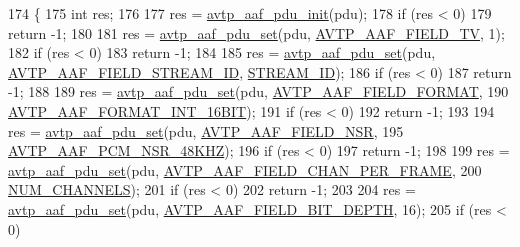 \begin{DoxyCode}
174 \{
175     \textcolor{keywordtype}{int} res;
176 
177     res = \hyperlink{avtp__aaf_8h_abbf7b8f31bede05bb514b548a0f9708f}{avtp\_aaf\_pdu\_init}(pdu);
178     \textcolor{keywordflow}{if} (res < 0)
179         \textcolor{keywordflow}{return} -1;
180 
181     res = \hyperlink{avtp__aaf_8h_af242dc7ed6c5ca5ea8e9d5071c13e19d}{avtp\_aaf\_pdu\_set}(pdu, \hyperlink{avtp__aaf_8h_a7eaee6c1ebc806c0401dbe7b14cd22dba490dfd07398cccbefac45e6a58692eab}{AVTP\_AAF\_FIELD\_TV}, 1);
182     \textcolor{keywordflow}{if} (res < 0)
183         \textcolor{keywordflow}{return} -1;
184 
185     res = \hyperlink{avtp__aaf_8h_af242dc7ed6c5ca5ea8e9d5071c13e19d}{avtp\_aaf\_pdu\_set}(pdu, \hyperlink{avtp__aaf_8h_a7eaee6c1ebc806c0401dbe7b14cd22dba4760c4bfc01d5a5200aa35cc1cdc0c13}{AVTP\_AAF\_FIELD\_STREAM\_ID}, 
      \hyperlink{aaf-talker_8c_ade86a80a3d067dece1f7e7cf957e3e92}{STREAM\_ID});
186     \textcolor{keywordflow}{if} (res < 0)
187         \textcolor{keywordflow}{return} -1;
188 
189     res = \hyperlink{avtp__aaf_8h_af242dc7ed6c5ca5ea8e9d5071c13e19d}{avtp\_aaf\_pdu\_set}(pdu, \hyperlink{avtp__aaf_8h_a7eaee6c1ebc806c0401dbe7b14cd22dbad867950e53bb3b120e37a7598fcd1fb4}{AVTP\_AAF\_FIELD\_FORMAT},
190                         \hyperlink{avtp__aaf_8h_a9eba80944b5c061b495ca045ef887799}{AVTP\_AAF\_FORMAT\_INT\_16BIT});
191     \textcolor{keywordflow}{if} (res < 0)
192         \textcolor{keywordflow}{return} -1;
193 
194     res = \hyperlink{avtp__aaf_8h_af242dc7ed6c5ca5ea8e9d5071c13e19d}{avtp\_aaf\_pdu\_set}(pdu, \hyperlink{avtp__aaf_8h_a7eaee6c1ebc806c0401dbe7b14cd22dbaa7c9036133950993bf1311879c665634}{AVTP\_AAF\_FIELD\_NSR},
195                         \hyperlink{avtp__aaf_8h_a328e6cfab35eba3db6e5659df3cdef38}{AVTP\_AAF\_PCM\_NSR\_48KHZ});
196     \textcolor{keywordflow}{if} (res < 0)
197         \textcolor{keywordflow}{return} -1;
198 
199     res = \hyperlink{avtp__aaf_8h_af242dc7ed6c5ca5ea8e9d5071c13e19d}{avtp\_aaf\_pdu\_set}(pdu, \hyperlink{avtp__aaf_8h_a7eaee6c1ebc806c0401dbe7b14cd22dbab6202d8ac4e1b7e819e5adb08b90a346}{AVTP\_AAF\_FIELD\_CHAN\_PER\_FRAME},
200                                 \hyperlink{aaf-talker_8c_ae5597ce31d23d11493e6e674fe257d73}{NUM\_CHANNELS});
201     \textcolor{keywordflow}{if} (res < 0)
202         \textcolor{keywordflow}{return} -1;
203 
204     res = \hyperlink{avtp__aaf_8h_af242dc7ed6c5ca5ea8e9d5071c13e19d}{avtp\_aaf\_pdu\_set}(pdu, \hyperlink{avtp__aaf_8h_a7eaee6c1ebc806c0401dbe7b14cd22dbabedcf9db303c9373c61a44389d371993}{AVTP\_AAF\_FIELD\_BIT\_DEPTH}, 16);
205     \textcolor{keywordflow}{if} (res < 0)

\end{DoxyCode}
